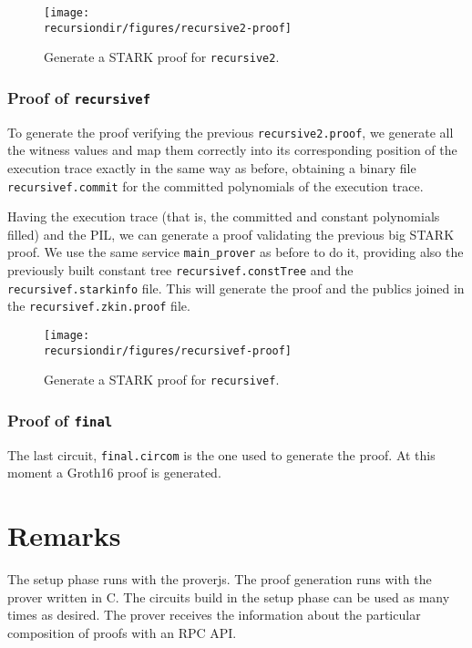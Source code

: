\begin{figure}[H]
\centering
\texttt{[image: \\recursiondir/figures/recursive2-proof]}
\caption{Generate a STARK proof for \texttt{recursive2}.}
\label{fig:recursive2-proof}
\end{figure}


\subsubsection{Proof of \texttt{recursivef}}

To generate the proof verifying the previous \texttt{recursive2.proof}, we generate all the witness values and map them correctly into its corresponding position of the execution trace exactly in the same way as before, obtaining a binary file \texttt{recursivef.commit} for the committed polynomials of the execution trace. 

Having the execution trace (that is, the committed and constant polynomials filled) and the PIL, we can generate a proof validating the previous big STARK proof. We use the same service \texttt{main\_prover} as before to do it, providing also the previously built constant tree \texttt{recursivef.constTree} and the \texttt{recursivef.starkinfo} file. This will generate the proof and the publics joined in the \texttt{recursivef.zkin.proof} file. 


\begin{figure}[H]
\centering
\texttt{[image: \\recursiondir/figures/recursivef-proof]}
\caption{Generate a STARK proof for \texttt{recursivef}.}
\label{fig:recursivef-proof}
\end{figure}



\subsubsection{Proof of \texttt{final}}

The last circuit, \texttt{final.circom} is the one used to generate the proof.
At this moment a Groth16 proof is generated.


\section{Remarks}

The setup phase runs with the proverjs. The proof generation 
runs with the prover written in C.
The circuits build in the setup phase can be used as many times
as desired.
The prover receives the information about the particular composition of 
proofs with an RPC API.


